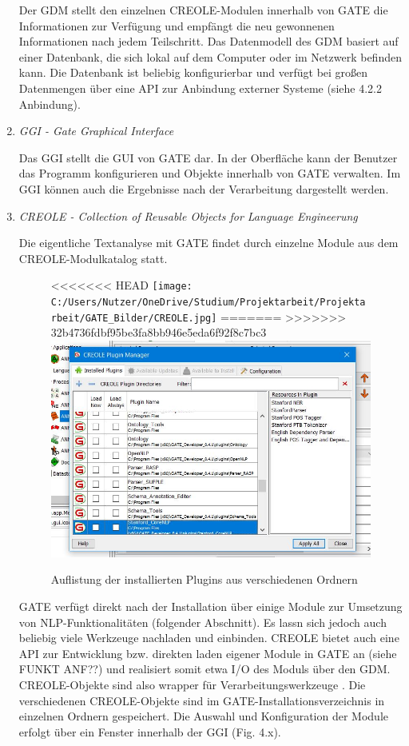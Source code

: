 \documentclass[12pt]{report}
\begin{document}
\begin{enumerate}
Der GDM stellt den einzelnen CREOLE-Modulen innerhalb von GATE die Informationen zur Verfügung und empfängt die neu gewonnenen Informationen nach jedem Teilschritt. Das Datenmodell des GDM basiert auf einer Datenbank, die sich lokal auf dem Computer oder im Netzwerk befinden kann. Die Datenbank ist beliebig konfigurierbar und verfügt bei großen Datenmengen über eine API zur Anbindung externer Systeme (siehe 4.2.2 \glqq  Anbindung\grqq{}). 
\item \textit{GGI - Gate Graphical Interface}

Das GGI stellt die GUI von GATE dar. In der Oberfläche kann der Benutzer das Programm konfigurieren und Objekte innerhalb von GATE verwalten. Im GGI können auch die Ergebnisse nach der Verarbeitung dargestellt werden.

\item \textit{CREOLE - Collection of Reusable Objects for Language Engineerung}

Die eigentliche Textanalyse mit GATE findet durch einzelne Module aus dem CREOLE-Modulkatalog statt.

\begin{figure}[h!]
\begin{center}
<<<<<<< HEAD
\texttt{[image: C:/Users/Nutzer/OneDrive/Studium/Projektarbeit/Projektarbeit/GATE\_Bilder/CREOLE.jpg]}
=======
>>>>>>> 32b4736fdbf95be3fa8bb946e5eda6f92f8c7bc3
\includegraphics[scale=0.7]{GATE_Bilder/CREOLE.jpg}
\caption{Auflistung der installierten Plugins aus verschiedenen Ordnern}
\end{center}
\end{figure} 

GATE verfügt direkt nach der Installation über einige Module zur Umsetzung von NLP-Funktionalitäten (folgender Abschnitt). Es lassn sich jedoch auch beliebig viele Werkzeuge nachladen und einbinden. CREOLE bietet auch eine API zur Entwicklung bzw. direkten laden eigener Module in GATE an (siehe FUNKT ANF??) und realisiert somit etwa I/O des Moduls über den GDM. CREOLE-Objekte sind also wrapper für Verarbeitungswerkzeuge \cite{cu02}. 
Die verschiedenen CREOLE-Objekte sind im GATE-Installationsverzeichnis in einzelnen Ordnern gespeichert. Die Auswahl und Konfiguration der Module erfolgt über ein Fenster innerhalb der GGI (Fig. 4.x).
\end{enumerate}
\end{document}
